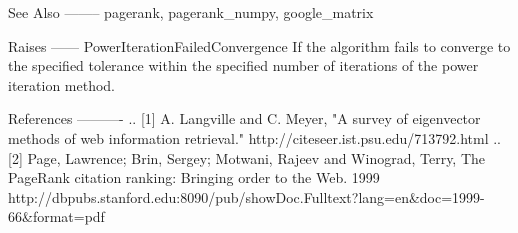 \begin{DoxyVerb}
See Also
--------
pagerank, pagerank_numpy, google_matrix

Raises
------
PowerIterationFailedConvergence
    If the algorithm fails to converge to the specified tolerance
    within the specified number of iterations of the power iteration
    method.

References
----------
.. [1] A. Langville and C. Meyer,
   "A survey of eigenvector methods of web information retrieval."
   http://citeseer.ist.psu.edu/713792.html
.. [2] Page, Lawrence; Brin, Sergey; Motwani, Rajeev and Winograd, Terry,
   The PageRank citation ranking: Bringing order to the Web. 1999
   http://dbpubs.stanford.edu:8090/pub/showDoc.Fulltext?lang=en&doc=1999-66&format=pdf
\end{DoxyVerb}
 
